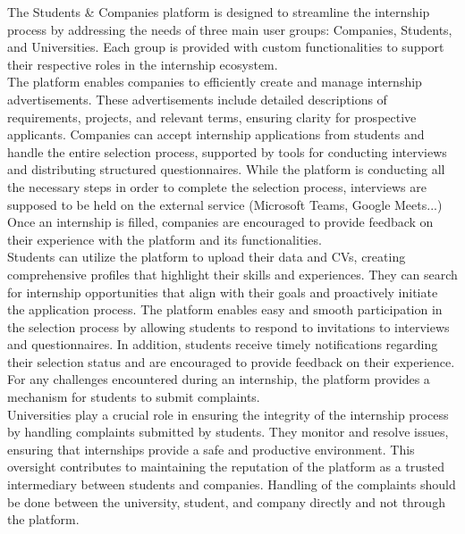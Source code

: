 

The Students \& Companies platform is designed to streamline the internship process by addressing the needs of three main user groups: Companies, Students, and Universities. Each group is provided with custom functionalities to support their respective roles in the internship ecosystem. \\

The platform enables companies to efficiently create and manage internship advertisements. These advertisements include detailed descriptions of requirements, projects, and relevant terms, ensuring clarity for prospective applicants. Companies can accept internship applications from students and handle the entire selection process, supported by tools for conducting interviews and distributing structured questionnaires. While the platform is conducting all the necessary steps in order to complete the selection process, interviews are supposed to be held on the external service (Microsoft Teams, Google Meets...) Once an internship is filled, companies are encouraged to provide feedback on their experience with the platform and its functionalities. \\

Students can utilize the platform to upload their data and CVs, creating comprehensive profiles that highlight their skills and experiences. They can search for internship opportunities that align with their goals and proactively initiate the application process. The platform enables easy and smooth participation in the selection process by allowing students to respond to invitations to interviews and questionnaires. In addition, students receive timely notifications regarding their selection status and are encouraged to provide feedback on their experience. For any challenges encountered during an internship, the platform provides a mechanism for students to submit complaints. \\

Universities play a crucial role in ensuring the integrity of the internship process by handling complaints submitted by students. They monitor and resolve issues, ensuring that internships provide a safe and productive environment. This oversight contributes to maintaining the reputation of the platform as a trusted intermediary between students and companies. Handling of the complaints should be done between the university, student, and company directly and not through the platform.

